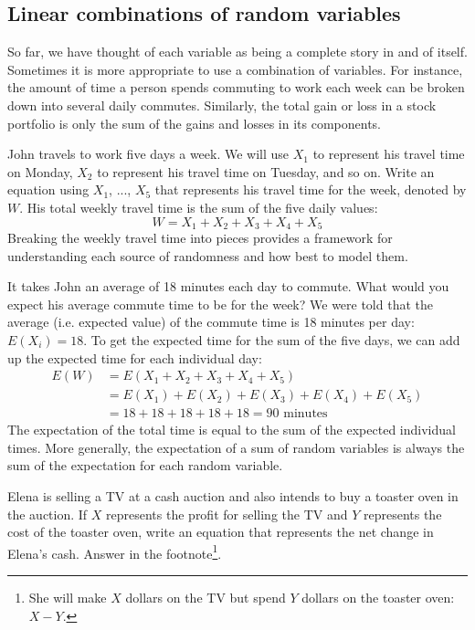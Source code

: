 
\subsection{Linear combinations of random variables}

So far, we have thought of each variable as being a complete story in and of itself. Sometimes it is more appropriate to use a combination of variables. For instance, the amount of time a person spends commuting to work each week can be broken down into several daily commutes. Similarly, the total gain or loss in a stock portfolio is only the sum of the gains and losses in its components.

\begin{example}{John travels to work five days a week. We will use $X_1$ to represent his travel time on Monday, $X_2$ to represent his travel time on Tuesday, and so on. Write an equation using $X_1$, ..., $X_5$ that represents his travel time for the week, denoted by $W$.}
His total weekly travel time is the sum of the five daily values:
$$ W = X_1 + X_2 + X_3 + X_4 + X_5 $$
Breaking the weekly travel time into pieces provides a framework for understanding each source of randomness and how best to model them.
\end{example}

\begin{example}{It takes John an average of 18 minutes each day to commute. What would you expect his average commute time to be for the week?}
We were told that the average (i.e. expected value) of the commute time is 18 minutes per day: $E(X_i) = 18$. To get the expected time for the sum of the five days, we can add up the expected time for each individual day:
\begin{align*}
E(W) &= E(X_1 + X_2 + X_3 + X_4 + X_5) \\
	&= E(X_1) + E(X_2) + E(X_3) + E(X_4) + E(X_5) \\
	&= 18 + 18 + 18 + 18 + 18 = 90\text{ minutes}
\end{align*}
The expectation of the total time is equal to the sum of the expected individual times. More generally, the expectation of a sum of random variables is always the sum of the expectation for each random variable.
\end{example}

\begin{exercise} \label{elenaIsSellingATVAndBuyingAToasterOvenAtAnAuction}
Elena is selling a TV at a cash auction and also intends to buy a toaster oven in the auction. If $X$ represents the profit for selling the TV and $Y$ represents the cost of the toaster oven, write an equation that represents the net change in Elena's cash. Answer in the footnote\footnote{She will make $X$ dollars on the TV but spend $Y$ dollars on the toaster oven: $X-Y$.}.
\end{exercise}

